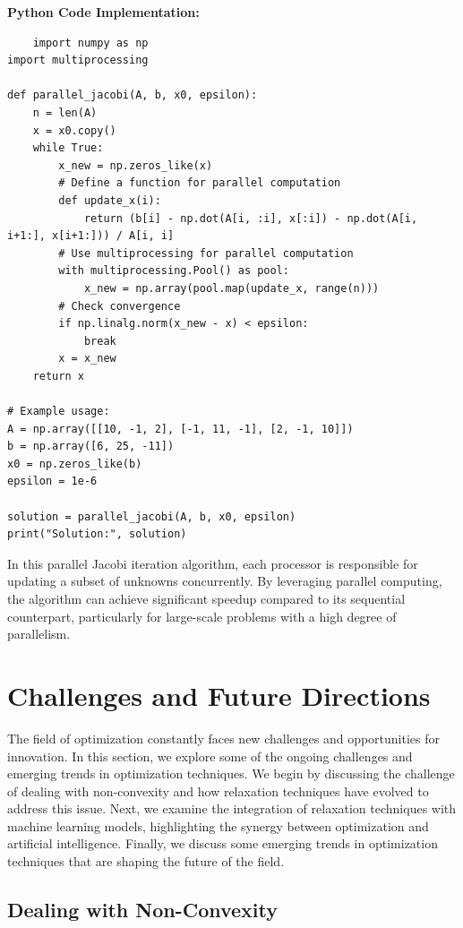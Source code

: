 \documentclass[12pt]{book} %
\begin{document}
\textbf{Python Code Implementation:}
\FloatBarrier
\begin{lstlisting}
    import numpy as np
import multiprocessing

def parallel_jacobi(A, b, x0, epsilon):
    n = len(A)
    x = x0.copy()
    while True:
        x_new = np.zeros_like(x)
        # Define a function for parallel computation
        def update_x(i):
            return (b[i] - np.dot(A[i, :i], x[:i]) - np.dot(A[i, i+1:], x[i+1:])) / A[i, i]
        # Use multiprocessing for parallel computation
        with multiprocessing.Pool() as pool:
            x_new = np.array(pool.map(update_x, range(n)))
        # Check convergence
        if np.linalg.norm(x_new - x) < epsilon:
            break
        x = x_new
    return x

# Example usage:
A = np.array([[10, -1, 2], [-1, 11, -1], [2, -1, 10]])
b = np.array([6, 25, -11])
x0 = np.zeros_like(b)
epsilon = 1e-6

solution = parallel_jacobi(A, b, x0, epsilon)
print("Solution:", solution)
\end{lstlisting}
\FloatBarrier

In this parallel Jacobi iteration algorithm, each processor is responsible for updating a subset of unknowns concurrently. By leveraging parallel computing, the algorithm can achieve significant speedup compared to its sequential counterpart, particularly for large-scale problems with a high degree of parallelism.


\section{Challenges and Future Directions}

The field of optimization constantly faces new challenges and opportunities for innovation. In this section, we explore some of the ongoing challenges and emerging trends in optimization techniques. We begin by discussing the challenge of dealing with non-convexity and how relaxation techniques have evolved to address this issue. Next, we examine the integration of relaxation techniques with machine learning models, highlighting the synergy between optimization and artificial intelligence. Finally, we discuss some emerging trends in optimization techniques that are shaping the future of the field.

\subsection{Dealing with Non-Convexity}
\end{document}

